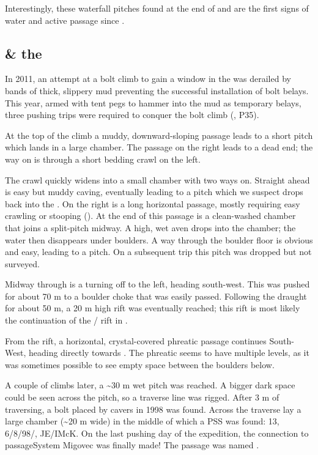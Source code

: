 Interestingly, these waterfall pitches found at the end of  and  are the first signs of water and active
passage since .


\subsection{\texorpdfstring{ \& the }{Apollo \& the Milky Way}}

In 2011, an attempt at a bolt climb to gain a window in the
 was derailed by bands of thick, slippery mud
preventing the successful installation of bolt belays. This year, armed
with tent pegs to hammer into the mud as temporary belays, three pushing
trips were required to conquer the bolt climb (, P35).

At the top of the climb a muddy, downward-sloping passage leads to a
short pitch which lands in a large chamber. The passage on the right
leads to a dead end; the way on is through a short bedding crawl on the
left.

The crawl quickly widens into a small chamber with two ways on. Straight
ahead is easy but muddy caving, eventually leading to a pitch which we
suspect drops back into the . On the right is a
long horizontal passage, mostly requiring easy crawling or stooping
(). At the end of this passage is a clean-washed chamber
that joins a split-pitch midway. A high, wet aven drops into the
chamber; the water then disappears under boulders. A way through the
boulder floor is obvious and easy, leading to a pitch. On a subsequent
trip this pitch was dropped but not surveyed.

Midway through  is a turning off to the left, heading
south-west. This was pushed for about 70 m to a boulder choke that was
easily passed. Following the draught for about 50 m, a 20 m high rift
was eventually reached; this rift is most likely the continuation of the
/ rift in .

From the rift, a horizontal, crystal-covered phreatic passage continues
South-West, heading directly towards . The phreatic seems
to have multiple levels, as it was sometimes possible to see empty space
between the boulders below.

A couple of climbs later, a \textasciitilde 30 m wet pitch was reached.
A bigger dark space could be seen across the pitch, so a traverse line
was rigged. After 3 m of traversing, a bolt placed by cavers in 1998 was
found. Across the traverse lay a large chamber (\textasciitilde 20 m
wide) in the middle of which a PSS was found:  13,
6/8/98/, JE/IMcK. On the last pushing day of the expedition, the
connection to passage{System Migovec} was finally made! The passage was named
.

